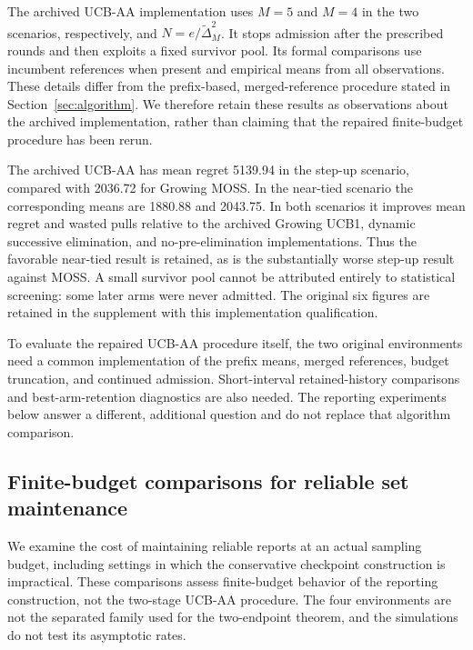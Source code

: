 \documentclass[11pt]{article}
\begin{document}
The archived UCB-AA implementation uses $M=5$ and $M=4$ in the two scenarios,
respectively, and $N=e/\widetilde\Delta_M^2$. It stops admission after the
prescribed rounds and then exploits a fixed survivor pool. Its formal
comparisons use incumbent references when present and empirical means from
all observations. These details differ from the prefix-based, merged-reference
procedure stated in Section~\ref{sec:algorithm}. We therefore retain these
results as observations about the archived implementation, rather than
claiming that the repaired finite-budget procedure has been rerun.



The archived UCB-AA has mean regret 5139.94 in the step-up scenario, compared
with 2036.72 for Growing MOSS. In the near-tied scenario the corresponding
means are 1880.88 and 2043.75. In both scenarios it improves mean regret and
wasted pulls relative to the archived Growing UCB1, dynamic successive
elimination, and no-pre-elimination implementations. Thus the favorable
near-tied result is retained, as is the substantially worse step-up result
against MOSS. A small survivor pool cannot be attributed entirely to
statistical screening: some later arms were never admitted. The original
six figures are retained in the supplement with this implementation
qualification.

To evaluate the repaired UCB-AA procedure itself, the two original environments
need a common implementation of the prefix means, merged references, budget
truncation, and continued admission. Short-interval retained-history
comparisons and best-arm-retention diagnostics are also needed. The reporting
experiments below answer a different, additional question and do not replace
that algorithm comparison.

\subsection{Finite-budget comparisons for reliable set maintenance}
\label{sec:experiments}

We examine the cost of maintaining reliable reports at an actual sampling
budget, including settings in which the conservative checkpoint construction
is impractical. These comparisons assess finite-budget behavior of the reporting construction,
not the two-stage UCB-AA procedure. The four
environments are not the separated family used for the two-endpoint theorem,
and the simulations do not test its asymptotic rates.
\end{document}
